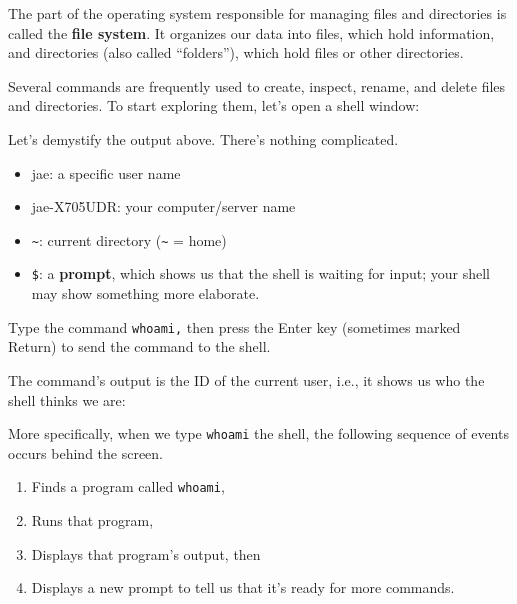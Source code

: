 \documentclass[
  letterpaper,
  DIV=11,
  numbers=noendperiod]{scrreprt}
\newenvironment{Shaded}{\begin{snugshade}}{\end{snugshade}}
\newcommand{\CommentTok}[1]{\textcolor[rgb]{0.37,0.37,0.37}{#1}}
\newcommand{\ExtensionTok}[1]{\textcolor[rgb]{0.00,0.23,0.31}{#1}}
\newcommand{\NormalTok}[1]{\textcolor[rgb]{0.00,0.23,0.31}{#1}}
\providecommand{\tightlist}{%
  \setlength{\itemsep}{0pt}\setlength{\parskip}{0pt}}\usepackage{longtable,booktabs,array}
\begin{document}
The part of the operating system responsible for managing files and
directories is called the \textbf{file system}. It organizes our data
into files, which hold information, and directories (also called
``folders''), which hold files or other directories.

Several commands are frequently used to create, inspect, rename, and
delete files and directories. To start exploring them, let's open a
shell window:

\begin{Shaded}
\end{Shaded}

Let's demystify the output above. There's nothing complicated.

\begin{itemize}
\tightlist
\item
  jae: a specific user name
\item
  jae-X705UDR: your computer/server name
\item
  \texttt{\textasciitilde{}}: current directory
  (\texttt{\textasciitilde{}} = home)
\item
  \texttt{\$}: a \textbf{prompt}, which shows us that the shell is
  waiting for input; your shell may show something more elaborate.
\end{itemize}

Type the command \texttt{whoami,} then press the Enter key (sometimes
marked Return) to send the command to the shell.

The command's output is the ID of the current user, i.e., it shows us
who the shell thinks we are:

\begin{Shaded}
\end{Shaded}

More specifically, when we type \texttt{whoami} the shell, the following
sequence of events occurs behind the screen.

\begin{enumerate}
\def\labelenumi{\arabic{enumi}.}
\tightlist
\item
  Finds a program called \texttt{whoami},
\item
  Runs that program,
\item
  Displays that program's output, then
\item
  Displays a new prompt to tell us that it's ready for more commands.
\end{enumerate}
\end{document}
